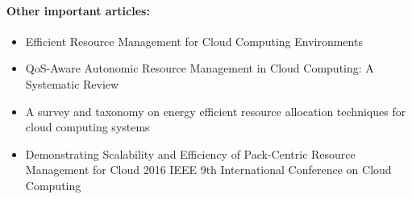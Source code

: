 \documentclass[11pt]{article}
\begin{document}
\paragraph{Other important articles:}

\begin{itemize}
    \item Efficient Resource Management for Cloud Computing Environments
    \item QoS-Aware Autonomic Resource Management in Cloud Computing: A Systematic Review
    \item A survey and taxonomy on energy efficient resource allocation techniques for cloud computing systems
    \item Demonstrating Scalability and Efficiency of Pack-Centric Resource Management for Cloud
        2016 IEEE 9th International Conference on Cloud Computing
\end{itemize}
\end{document}
